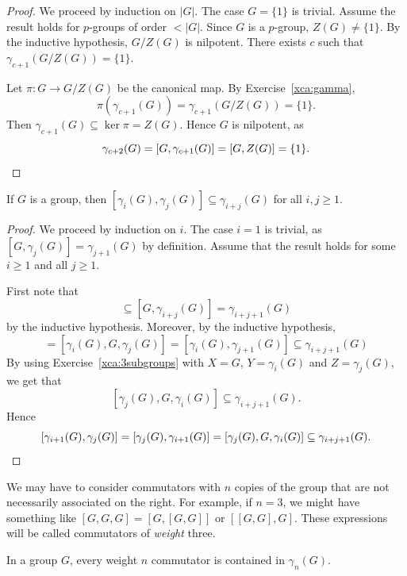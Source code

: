 \begin{proof}
We proceed by induction on $|G|$. The case $G=\{1\}$ is trivial. 
Assume the result holds for $p$-groups of order $<|G|$. Since 
$G$ is a $p$-group, $Z(G)\ne\{1\}$. By the inductive hypothesis, 
$G/Z(G)$ is nilpotent. There exists $c$ such that 
$\gamma_{c+1}(G/Z(G))=\{1\}$. 
	
Let $\pi\colon G\to G/Z(G)$ be the canonical map.  
By Exercise~\ref{xca:gamma},
\[
\pi(\gamma_{c+1}(G))=\gamma_{c+1}(G/Z(G))=\{1\}. 
\]
Then $\gamma_{c+1}(G)\subseteq \ker\pi=Z(G)$. Hence
$G$ is nilpotent, as 
\[	
\gamma_{c+2}(G)=[G,\gamma_{c+1}(G)]=[G,Z(G)]=\{1\}.\qedhere
\]
\end{proof}

\begin{theorem}
\label{thm:gamma}
If $G$ is a group, then $[\gamma_i(G),\gamma_j(G)]\subseteq
\gamma_{i+j}(G)$ for all $i,j\geq1$.	
\end{theorem}

\begin{proof}
We proceed by induction on $i$. The case $i=1$ is trivial, as
$[G,\gamma_j(G)]=\gamma_{j+1}(G)$ by definition. Assume that
the result holds for some $i\geq1$ and all $j\geq 1$. 
	
First note that 
\begin{equation*}
[G,\gamma_i(G),\gamma_j(G)]\subseteq [G,\gamma_{i+j}(G)]=\gamma_{i+j+1}(G)
\end{equation*}
by the inductive hypothesis. Moreover, by the inductive hypothesis, 
\begin{equation*}
[\gamma_i(G),\gamma_j(G),G]=[\gamma_i(G),G,\gamma_j(G)]=[\gamma_{i}(G),\gamma_{j+1}(G)]\subseteq \gamma_{i+j+1}(G)
\end{equation*}
By using Exercise~\ref{xca:3subgroups} with $X=G$, $Y=\gamma_i(G)$ and $Z=\gamma_j(G)$,
we get that 
\[
[\gamma_j(G),G,\gamma_i(G)]\subseteq \gamma_{i+j+1}(G).
\]
Hence  
\[
[\gamma_{i+1}(G),\gamma_{j}(G)]=[\gamma_{j}(G),\gamma_{i+1}(G)]=[\gamma_j(G),G,\gamma_i(G)]\subseteq \gamma_{i+j+1}(G).\qedhere
\]
\end{proof}

We may have to consider commutators with $n$ copies of the group that are not necessarily associated on the right. For example, if $n=3$, we might have something like $[G,G,G]=[G,[G,G]]$ or $[[G,G],G]$. These expressions will be called commutators of \emph{weight} three. 

\begin{corollary}
In a group $G$, every weight $n$ commutator is contained in 
$\gamma_n(G)$.
\end{corollary}

